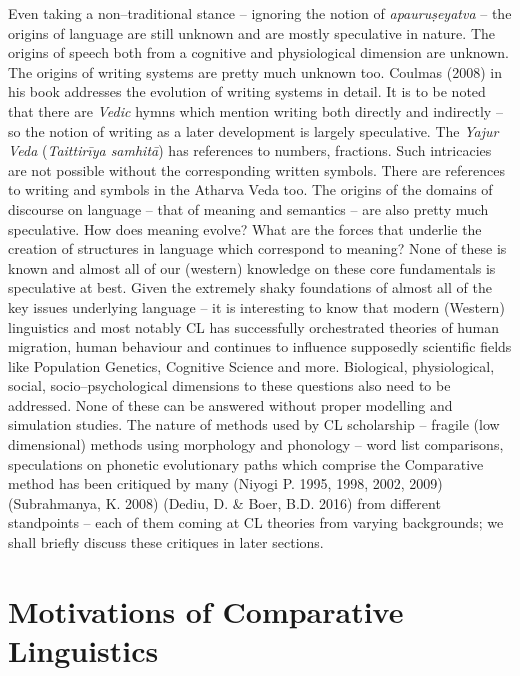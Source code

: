Even taking a non–traditional stance – ignoring the notion of \textit{apauruṣeyatva} – the origins of language are still unknown and are mostly speculative in nature. The origins of speech both from a cognitive and physiological dimension are unknown. The origins of writing systems are pretty much unknown too. Coulmas (2008) in his book addresses the evolution of writing systems in detail. It is to be noted that there are \textit{Vedic} hymns which mention writing both directly and indirectly – so the notion of writing as a later development is largely speculative. The \textit{Yajur Veda} (\textit{Taittirīya samhitā}) has references to numbers, fractions. Such intricacies are not possible without the corresponding written symbols. There are references to writing and symbols in the Atharva Veda too. The origins of the domains of discourse on language – that of meaning and semantics – are also pretty much speculative. How does meaning evolve? What are the forces that underlie the creation of structures in language which correspond to meaning? None of these is known and almost all of our (western) knowledge on these core fundamentals is speculative at best. Given the extremely shaky foundations of almost all of the key issues underlying language – it is interesting to know that modern (Western) linguistics and most notably CL has successfully orchestrated theories of human migration, human behaviour and continues to influence supposedly scientific fields like Population Genetics, Cognitive Science and more. Biological, physiological, social, socio–psychological dimensions to these questions also need to be addressed. None of these can be answered without proper modelling and simulation studies. The nature of methods used by CL scholarship – fragile (low dimensional) methods using morphology and phonology – word list comparisons, speculations on phonetic evolutionary paths which comprise the Comparative method has been critiqued by many (Niyogi P. 1995, 1998, 2002, 2009) (Subrahmanya, K. 2008) (Dediu, D. \& Boer, B.D. 2016) from different standpoints – each of them coming at CL theories from varying backgrounds; we shall briefly discuss these critiques in later sections.


\section*{Motivations of Comparative Linguistics}

